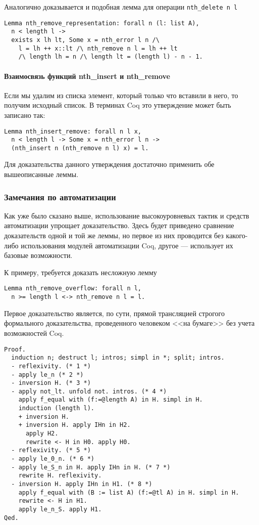 Аналогично доказывается и подобная лемма для операции \texttt{nth\_delete n l}
\begin{Verbatim}[fontsize=\small]
Lemma nth_remove_representation: forall n (l: list A),
  n < length l ->
  exists x lh lt, Some x = nth_error l n /\
    l = lh ++ x::lt /\ nth_remove n l = lh ++ lt
    /\ length lh = n /\ length lt = (length l) - n - 1.
\end{Verbatim}

\paragraph{Взаимосвязь функций nth\_insert и nth\_remove} Если мы удалим из списка элемент, который только что вставили в него, то получим исходный список. В терминах Coq это утверждение может быть записано так:
\begin{Verbatim}[fontsize=\small]
Lemma nth_insert_remove: forall n l x,
  n < length l -> Some x = nth_error l n ->
  (nth_insert n (nth_remove n l) x) = l.
\end{Verbatim}

Для доказательства данного утверждения достаточно применить обе вышеописанные леммы.

\subsubsection{Замечания по автоматизации}

Как уже было сказано выше, использование высокоуровневых тактик и средств автоматизации упрощает доказательство. Здесь будет приведено сравнение доказательств одной и той же леммы, но первое из них проводится без какого-либо использования модулей автоматизации Coq, другое --- использует их базовые возможности.

К примеру, требуется доказать несложную лемму
\begin{Verbatim}[fontsize=\small]
Lemma nth_remove_overflow: forall n l,
  n >= length l <-> nth_remove n l = l.
\end{Verbatim}

Первое доказательство является, по сути, прямой трансляцией строгого формального доказательства, проведенного человеком <<на бумаге>> без учета возможностей Coq.
\begin{Verbatim}[fontsize=\small]
Proof.
  induction n; destruct l; intros; simpl in *; split; intros.
  - reflexivity. (* 1 *)
  - apply le_n (* 2 *)
  - inversion H. (* 3 *)
  - apply not_lt. unfold not. intros. (* 4 *)
    apply f_equal with (f:=@length A) in H. simpl in H.
    induction (length l).
    + inversion H.
    + inversion H. apply IHn in H2.
      apply H2.
      rewrite <- H in H0. apply H0.
  - reflexivity. (* 5 *)
  - apply le_0_n. (* 6 *)
  - apply le_S_n in H. apply IHn in H. (* 7 *)
    rewrite H. reflexivity.
  - inversion H. apply IHn in H1. (* 8 *)
    apply f_equal with (B := list A) (f:=@tl A) in H. simpl in H.
    rewrite <- H in H1.
    apply le_n_S. apply H1.
Qed.
\end{Verbatim}

